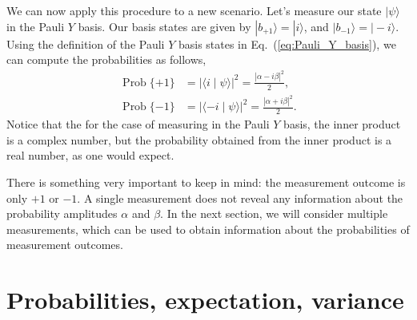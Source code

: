 We can now apply this procedure to a new scenario. Let's measure our state $|\psi\rangle$ in the Pauli $Y$ basis.
Our basis states are given by $|b_{+1}\rangle=|i\rangle$, and $|b_{-1}\rangle=|-i\rangle$.
Using the definition of the Pauli $Y$ basis states in Eq.~(\ref{eq:Pauli_Y_basis}), we can compute the probabilities as follows,
\begin{equation}
\begin{aligned}
    \operatorname{Prob}\{+1\} &=|\langle i \mid \psi\rangle|^2=\frac{|\alpha-i \beta|^2}{2}, \\
    \operatorname{Prob}\{-1\} &=|\langle-i \mid \psi\rangle|^2=\frac{|\alpha+i \beta|^2}{2}.
\end{aligned}
\end{equation}
Notice that the for the case of measuring in the Pauli $Y$ basis, the inner product is a complex number, but the probability obtained from the inner product is a real number, as one would expect.


There is something very important to keep in mind: the measurement outcome is only $+1$ or $-1$. A single measurement does not reveal any information about the probability amplitudes $\alpha$ and $\beta$.
In the next section, we will consider multiple measurements, which can be used to obtain information about the probabilities of measurement outcomes.



\section{Probabilities, expectation, variance}

